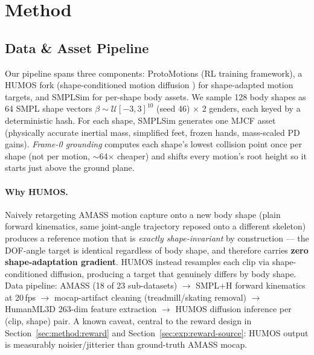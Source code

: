 \section{Method}
\label{sec:method}

\subsection{Data \& Asset Pipeline}
\label{sec:method:data}

Our pipeline spans three components: ProtoMotions (RL training framework), a HUMOS fork
(shape-conditioned motion diffusion ) for shape-adapted motion targets, and SMPLSim for
per-shape body assets. We sample 128 body shapes as 64 SMPL shape vectors $\beta \sim
\mathcal{U}[-3,3]^{10}$ (seed 46) $\times$ 2 genders, each keyed by a deterministic hash. For each
shape, SMPLSim generates one MJCF asset (physically accurate inertial mass, simplified feet,
frozen hands, mass-scaled PD gains). \emph{Frame-0 grounding} computes each shape's lowest
collision point once per shape (not per motion, $\sim$64$\times$ cheaper) and shifts every
motion's root height so it starts just above the ground plane.

\paragraph{Why HUMOS.} Naively retargeting AMASS motion capture onto a new body shape (plain
forward kinematics, same joint-angle trajectory reposed onto a different skeleton) produces a
reference motion that is \emph{exactly shape-invariant} by construction — the DOF-angle target is
identical regardless of body shape, and therefore carries \textbf{zero shape-adaptation gradient}.
HUMOS instead resamples each clip via shape-conditioned diffusion, producing a target that
genuinely differs by body shape. Data pipeline: AMASS (18 of 23 sub-datasets) $\to$ SMPL+H forward
kinematics at 20\,fps $\to$ mocap-artifact cleaning (treadmill/skating removal) $\to$ HumanML3D
263-dim feature extraction $\to$ HUMOS diffusion inference per (clip, shape) pair. A known
caveat, central to the reward design in Section~\ref{sec:method:reward} and
Section~\ref{sec:exp:reward-source}: HUMOS output is measurably noisier/jitterier than
ground-truth AMASS mocap.

